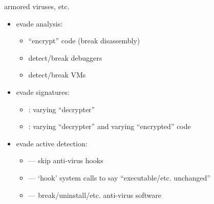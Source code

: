 \begin{frame}{armored viruses, etc.}
    \begin{itemize}
    \item evade analysis: 
        \begin{itemize}
        \item ``encrypt'' code (break disassembly)
        \item detect/break debuggers
        \item detect/break VMs
        \end{itemize}
    \item evade signatures:
        \begin{itemize}
        \item {}: varying ``decrypter''
        \item {}: varying ``decrypter'' and varying ``encrypted'' code
        \end{itemize}
    \item evade active detection:
        \begin{itemize}
        \item {} --- skip anti-virus hooks
        \item {} --- `hook' system calls to say ``executable/etc. unchanged''
        \item {} --- break/uninstall/etc. anti-virus software
        \end{itemize}
    \end{itemize}
\end{frame}

